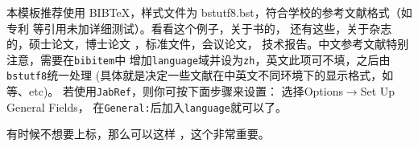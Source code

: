 本模板推荐使用 BIB\TeX，样式文件为 bstutf8.bst，符合学校的参考文献格式（如专利
等引用未加详细测试）。看看这个例子，关于书的，
还有这些，关于杂志的，硕士论文，博士论文
，标准文件，会议论文，%
技术报告。中文参考文献\textsf{特别注意}，需要在\verb|bibitem|中
增加\verb|language|域并设为\verb|zh|，英文此项可不填，之后由\verb|bstutf8|统一处理
(具体就是决定一些文献在中英文不同环境下的显示格式，如等、etc)。
若使用\verb|JabRef|，则你可按下面步骤来设置：
选择\textsf{Options}$\rightarrow$\textsf{Set Up General Fields}，
在\verb|General:|后加入\verb|language|就可以了。

有时候不想要上标，那么可以这样 \cite{shaheshang}，这个非常重要。







